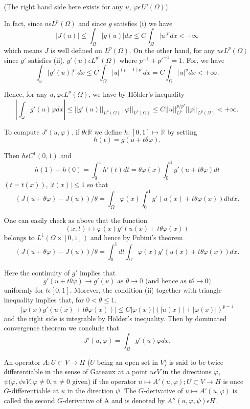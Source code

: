 (The right hand side here exists for any $u$, $\varphi \epsilon L^{p} (\Omega)$).

In fact, since $u \epsilon L^{p} (\Omega)$ and since $g$ satisfies (i) we have
$$
|J(u)| \leq \int_{\Omega} |g(u)|dx \leq C \int_{\Omega} |u|^{p} dx < + \infty
$$
which means $J$ is well defined on $L^{p} (\Omega)$. On the other hand, for any $u \epsilon L^{p} (\Omega)$ since $g'$ satisfies (ii), $g'(u) \epsilon L^{p'} (\Omega)$ where $p^{-1} + p'^{-1} = 1$. For, we have
$$
\int_{\omega} |g'(u)|^{p'} dx \leq C \int_{\Omega} |u|^{(p-1)p'} dx = C \int_{\Omega} |u|^{p} dx < + \infty.
$$

Hence, for any $u, \varphi \epsilon L^{p} (\Omega)$, we have by H\"{o}lder's inequality
$$
\left| \int_{\omega} g'(u) \varphi dx\right| \leq || g'(u) ||_{L^{p}(\Omega)} || \varphi ||_{L^{p}(\Omega)} \leq C || u ||_{L^{p}}^{p/p'} || \varphi ||_{L^{p} (\Omega)} < + \infty.
$$

To compute $J'(u, \varphi)$, if $\theta \epsilon \mathbb{R}$ we define $h : [0, 1] \mapsto \mathbb{R}$ by setting
$$
h(t) = g(u + t\theta \varphi).
$$

Then $h \epsilon C^{1} (0, 1)$ and
$$
h(1) - h(0) = \int_{0}^{1} h'(t) dt = \theta \varphi (x) \int_{0}^{1} g'(u + t \theta \varphi )dt
$$
$(t = t(x))$, $|t(x)| \leq 1$ so that
$$
(J(u + \theta \varphi) - J(u))/ \theta = \int_{\Omega} \varphi (x) \int_{0}^{1} g'(u(x) + t \theta \varphi (x)) dt dx.
$$

One can easily check as above that the function
$$
(x, t) \mapsto \varphi(x) g'(u(x) + t\theta \varphi (x))
$$
belongs to $L^{1} (\Omega \times [0, 1])$ and hence by Fubini's theorem
$$
(J(u + \theta \varphi) - J(u))/ \theta = \int_{0}^{1} dt \int_{\Omega} \varphi (x) g'(u(x) + t \theta \varphi (x))dx.
$$\pageoriginale

Here the continuity of $g'$ implies that
$$
g'(u + t \theta \varphi) \to g'(u) \text{ as } \theta \to 0 \text{ (and hence as } t \theta \to 0) 
$$
uniformly for $t \epsilon [0, 1]$. Morever, the condition (ii) together with triangle inequality implies that, for $0 < \theta \leq 1$.
$$
|\varphi (x) g' (u(x) + t\theta \varphi (x))| \leq C |\varphi (x)| (|u(x)| + |\varphi (x)|)^{p-1}
$$
and the right side is integrable by H\"{o}lder's inequality. Then by dominated convergence theorem we conclude that
$$
J' (u, \varphi) = \int_{\Omega} g'(u) \varphi dx.
$$

\begin{definition}\label{chap1-def1.2}
An operator $A : U \subset V \to H$ ($U$ being an open set in $V$) is said to be twice differentiable in the sense of Gateaux at a point $u \epsilon V$ in the directions $\varphi$, $\psi(\varphi, \psi \epsilon V, \varphi \neq 0, \psi \neq 0$ given) if the operator $u \mapsto A'(u, \varphi) ; U \subset V \to H$ is once $G$-differentiable at $u$ in the direction $\psi$. The $G$-derivative of $u \mapsto A'(u, \varphi)$ is called the second $G$-derivative of A and is denoted by $A''(u, \varphi, \psi) \epsilon H$. 
\end{definition}

